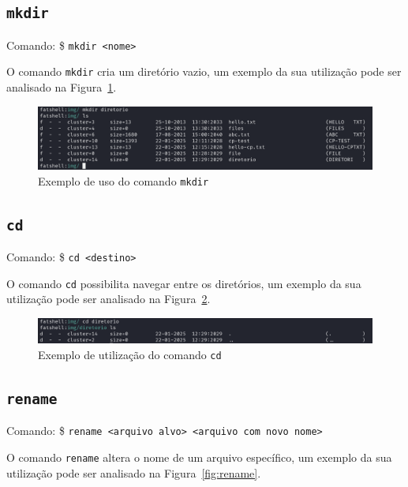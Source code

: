 \documentclass[
    12pt,				%
    oneside,   	        %
    a4paper,			%
    english,			%
    french,				%
    spanish,			%
    brazil,				%
    ]{pacotes/abntex2}
\begin{document}

\subsection{\texttt{mkdir}}
\label{subsec:mkdir}
Comando: \$ \texttt{mkdir <nome>}

O comando \texttt{mkdir} cria um diretório vazio, um exemplo da sua utilização pode ser analisado na Figura~\ref{fig:mkdir}.

\begin{figure}[H]
    \centering
    \includegraphics[width=450pt]{figuras/resultados/9-mkdir.PNG}
    \caption{Exemplo de uso do comando \texttt{mkdir}}
    \label{fig:mkdir}
\end{figure}


\subsection{\texttt{cd}}
\label{subsec:cd}
Comando: \$ \texttt{cd <destino>}

O comando \texttt{cd} possibilita navegar entre os diretórios, um exemplo da sua utilização pode ser analisado na Figura~\ref{fig:cd}.
 
\begin{figure}[H]
    \centering
    \includegraphics[width=450pt]{figuras/resultados/10-cd.PNG}
    \caption{Exemplo de utilização do comando \texttt{cd}}
    \label{fig:cd}
\end{figure}


\subsection{\texttt{rename}}
\label{subsec:rename}
Comando: \$ \texttt{rename <arquivo alvo> <arquivo com novo nome>}

O comando \texttt{rename} altera o nome de um arquivo específico, um exemplo da sua utilização pode ser analisado na Figura~\ref{fig:rename}.
\end{document}
